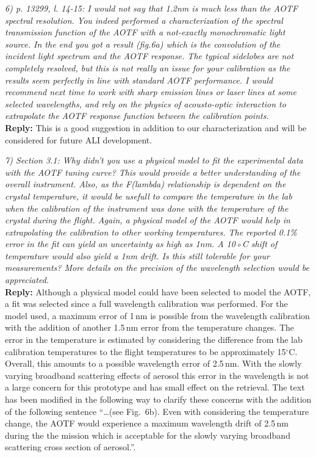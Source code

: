 \documentclass[12pt, notitlepage]{article}
\begin{document}
\hrulefill

\textit{6) p. 13299, l. 14-15: I would not say that 1.2nm is much less than the AOTF spectral
resolution. You indeed performed a characterization of the spectral transmission
function of the AOTF with a not-exactly monochromatic light source. In the end you got
a result (fig.6a) which is the convolution of the incident light spectrum and the AOTF
response. The typical sidelobes are not completely resolved, but this is not really an
issue for your calibration as the results seem perfectly in line with standard AOTF performance.
I would recommend next time to work with sharp emission lines or laser lines
at some selected wavelengths, and rely on the physics of acousto-optic interaction to
extrapolate the AOTF response function between the calibration points.}\\

\textbf{Reply:} This is a good suggestion in addition to our characterization and will be considered for future ALI development.

\hrulefill

\textit{7) Section 3.1: Why didn’t you use a physical model to fit the experimental data with
the AOTF tuning curve? This would provide a better understanding of the overall instrument.
Also, as the F(lambda) relationship is dependent on the crystal temperature,
it would be usefull to compare the temperature in the lab when the calibration of the
instrument was done with the temperature of the crystal during the flight. Again, a
physical model of the AOTF would help in extrapolating the calibration to other working
temperatures. The reported 0.1\% error in the fit can yield an uncertainty as high as
1nm. A 10◦C shift of temperature would also yield a 1nm drift. Is this still tolerable for
your measurements? More details on the precision of the wavelength selection would
be appreciated.}\\

\textbf{Reply:} Although a physical model could have been selected to model the AOTF, a fit was selected since a full wavelength calibration was performed. For the model used, a  maximum error of 1\,nm is possible from the wavelength calibration with the addition of another 1.5\,nm error from the temperature changes. The error in the temperature is estimated by considering the difference from the lab calibration temperatures to the flight temperatures to be approximately 15$^{\circ}$C. Overall, this amounts to a possible wavelength error of 2.5\,nm. With the slowly varying broadband scattering effects of aerosol this error in the wavelength is not a large concern for this prototype and  has small effect on the retrieval. The text has been modified in the following way to clarify these concerns with the addition of the following sentence ``\ldots(see Fig.~6b). Even with considering the temperature change, the AOTF would experience a maximum wavelength drift of 2.5\,nm during the the mission which is acceptable for the slowly varying broadband scattering cross section of aerosol.''.
\end{document}
